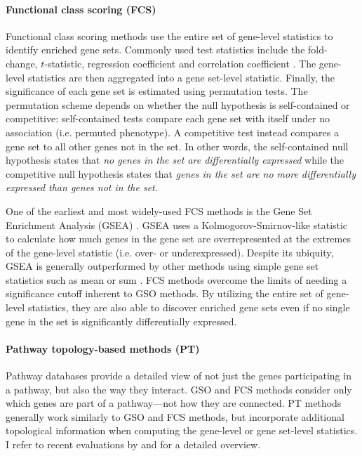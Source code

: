 \paragraph{Functional class scoring (FCS)}
Functional class scoring methods use the entire set of gene-level statistics to identify enriched gene sets. Commonly used test statistics include the fold-change, $t$-statistic, regression coefficient and correlation coefficient \cite{Ackermann2009}. The gene-level statistics are then aggregated into a gene set-level statistic. Finally, the significance of each gene set is estimated using permutation tests. The permutation scheme depends on whether the null hypothesis is self-contained or competitive: self-contained tests compare each gene set with itself under no association (i.e. permuted phenotype). A competitive test instead compares a gene set to all other genes not in the set. In other words, the self-contained null hypothesis states that \emph{no genes in the set are differentially expressed} while the competitive null hypothesis states that \emph{genes in the set are no more differentially expressed than genes not in the set}.

One of the earliest and most widely-used FCS methods is the Gene Set Enrichment Analysis (GSEA) \cite{Subramanian2005}. GSEA uses a Kolmogorov-Smirnov-like statistic to calculate how much genes in the gene set are overrepresented at the extremes of the gene-level statistic (i.e. over- or underexpressed). Despite its ubiquity, GSEA is generally outperformed by other methods using simple gene set statistics such as mean or sum \cite{Ackermann2009,Hung2011,Mathur2018}. FCS methods overcome the limits of needing a significance cutoff inherent to GSO methods. By utilizing the entire set of gene-level statistics, they are also able to discover enriched gene sets even if no single gene in the set is significantly differentially expressed.

\paragraph{Pathway topology-based methods (PT)}
Pathway databases provide a detailed view of not just the genes participating in a pathway, but also the way they interact. GSO and FCS methods consider only which genes are part of a pathway---not how they are connected. PT methods generally work similarly to GSO and FCS methods, but incorporate additional topological information when computing the gene-level or gene set-level statistics.
I refer to recent evaluations by \citeauthor{Bayerlova2015} \cite{Bayerlova2015} and \citeauthor{Ihnatova2018} \cite{Ihnatova2018} for a detailed overview.

